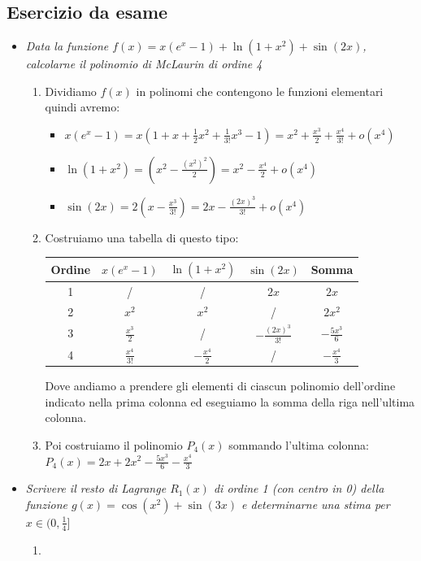 \documentclass[10pt, a4paper]{article}
\begin{document}
    \subsection{Esercizio da esame}
        \begin{itemize}
            \item \textit{Data la funzione $f(x)=x(e^x-1)+\ln(1+x^2)+\sin(2x)$, calcolarne il polinomio di McLaurin di ordine 4} \begin{enumerate}
                \item Dividiamo $f(x)$ in polinomi che contengono le funzioni elementari quindi avremo: \begin{itemize}
                    \item $x(e^x-1)=x\left(1+x+\frac{1}{2}x^2+\frac{1}{3!}x^3-1\right)=x^2+\frac{x^3}{2}+\frac{x^4}{3!}+o\left(x^4\right)$
                    \item $\ln(1+x^2)=\left(x^2-\frac{(x^2)^2}{2}\right)=x^2-\frac{x^4}{2}+o\left(x^4\right)$
                    \item $\sin(2x)=2\left(x-\frac{x^3}{3!}\right)=2x-\frac{(2x)^3}{3!}+o\left(x^4\right)$
                \end{itemize}
                \item Costruiamo una tabella di questo tipo: 
                \begin{center}
                    \begin{tabular}{| c | c | c | c | c |}
                        \hline
                        \textbf{Ordine} & $x(e^x-1)$ & $\ln(1+x^2)$ & $\sin(2x)$ & \textbf{Somma}\\
                        \hline
                        1 & / & / & $2x$ & $2x$ \\
                        \hline
                        2 & $x^2$ & $x^2$ & / & $2x^2$\\
                        \hline
                        3 & $\frac{x^3}{2}$ & / & $-\frac{(2x)^3}{3!}$ & $-\frac{5x^3}{6}$\\
                        \hline
                        4 & $\frac{x^4}{3!}$ & $-\frac{x^4}{2}$ & / & $-\frac{x^4}{3}$\\
                        \hline
                    \end{tabular}
                \end{center}
                Dove andiamo a prendere gli elementi di ciascun polinomio dell'ordine indicato nella prima colonna ed eseguiamo la somma della riga nell'ultima colonna.
                \item Poi costruiamo il polinomio $P_4(x)$ sommando l'ultima colonna: $P_4(x)=2x+2x^2-\frac{5x^3}{6}-\frac{x^4}{3}$
            \end{enumerate}
            \item \textit{Scrivere il resto di Lagrange $R_1(x)$ di ordine 1 (con centro in 0) della funzione $g(x)=\cos(x^2)+\sin(3x)$ e determinarne una stima per $x\in(0,\frac{1}{4}]$} \begin{enumerate}
                \item %
            \end{enumerate}
        \end{itemize}
\end{document}
